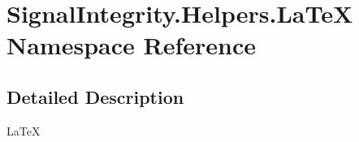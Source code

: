 \hypertarget{namespaceSignalIntegrity_1_1Helpers_1_1LaTeX}{}\section{Signal\+Integrity.\+Helpers.\+La\+TeX Namespace Reference}
\label{namespaceSignalIntegrity_1_1Helpers_1_1LaTeX}


\subsection{Detailed Description}
\begin{DoxyVerb}LaTeX\end{DoxyVerb}
 